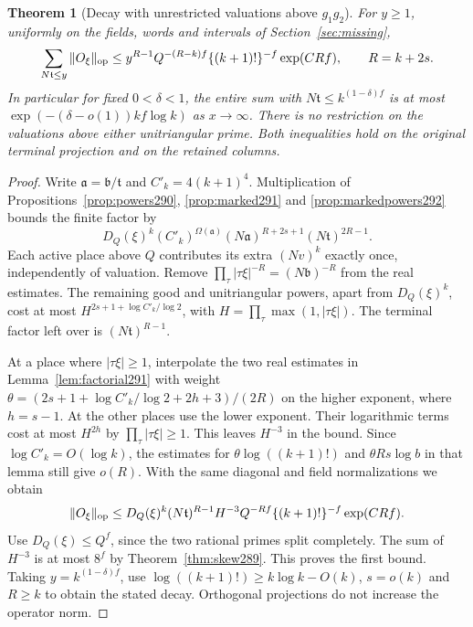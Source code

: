 \documentclass[a4paper,11pt]{article}
\newtheorem{theorem}[proposition]{Theorem}
\theoremstyle{definition}
\theoremstyle{remark}
\numberwithin{equation}{section}
\begin{document}
\begin{theorem}[Decay with unrestricted valuations above \(g_1g_2\)]\leavevmode
\label{thm:twolevels292}
For \(y\ge1\), uniformly on the fields, words and intervals
of Section~\ref{sec:missing},
\[
 \sum_{N\mathfrak t\le y}\|O_\xi\|_{\rm op}
    \le y^{R-1} Q^{-(R-k)f}\{(k+1)!\}^{-f}\exp(CRf),
               \qquad R=k+2s .
\]
In particular for fixed \(0<\delta<1\), the entire sum
with \(N\mathfrak t\le k^{(1-\delta)f}\) is at most
\(\exp(-(\delta-o(1))k f\log k)\) as \(x\to\infty\).
There is no restriction on the valuations above either
unitriangular prime. Both inequalities hold on the
original terminal projection and on the retained columns.
\end{theorem}
\begin{proof}
Write \(\mathfrak a=\mathfrak b/\mathfrak t\) and
\(C'_k=4(k+1)^4\). Multiplication of
Propositions~\ref{prop:powers290}, \ref{prop:marked291}
and \ref{prop:markedpowers292} bounds the finite factor by
\[
 D_Q(\xi)^k (C'_k)^{\Omega(\mathfrak a)}
       (N\mathfrak a)^{R+2s+1}(N\mathfrak t)^{2R-1}.
\]
Each active place above \(Q\) contributes its extra
\((Nv)^k\) exactly once, independently of valuation.
Remove \(\prod_\tau|\tau\xi|^{-R}=(N\mathfrak b)^{-R}\)
from the real estimates. The remaining good and
unitriangular powers, apart from \(D_Q(\xi)^k\), cost at
most \(H^{2s+1+\log C'_k/\log 2}\), with
\(H=\prod_\tau\max(1,|\tau\xi|)\). The terminal factor
left over is \((N\mathfrak t)^{R-1}\).

At a place where \(|\tau\xi|\ge1\), interpolate the two
real estimates in Lemma~\ref{lem:factorial291} with weight
\(\theta=(2s+1+\log C'_k/\log 2+2h+3)/(2R)\) on the
higher exponent, where \(h=s-1\). At the other places
use the lower exponent. Their logarithmic terms cost at
most \(H^{2h}\) by \(\prod_\tau|\tau\xi|\ge1\).
This leaves \(H^{-3}\) in the bound. Since
\(\log C'_k=O(\log k)\), the estimates for
\(\theta\log((k+1)!)\) and \(\theta Rs\log b\) in that
lemma still give \(o(R)\). With the same diagonal and
field normalizations we obtain
\[
 \|O_\xi\|_{\rm op}\le D_Q(\xi)^k(N\mathfrak t)^{R-1}
 H^{-3}Q^{-Rf}\{(k+1)!\}^{-f}\exp(CRf).
\]
Use \(D_Q(\xi)\le Q^f\), since the two rational primes
split completely. The sum of \(H^{-3}\) is at most \(8^f\)
by Theorem~\ref{thm:skew289}. This proves the first bound.
Taking \(y=k^{(1-\delta)f}\), use
\(\log((k+1)!)\ge k\log k-O(k)\), \(s=o(k)\) and \(R\ge k\)
to obtain the stated decay. Orthogonal projections do
not increase the operator norm.
\end{proof}
\end{document}
